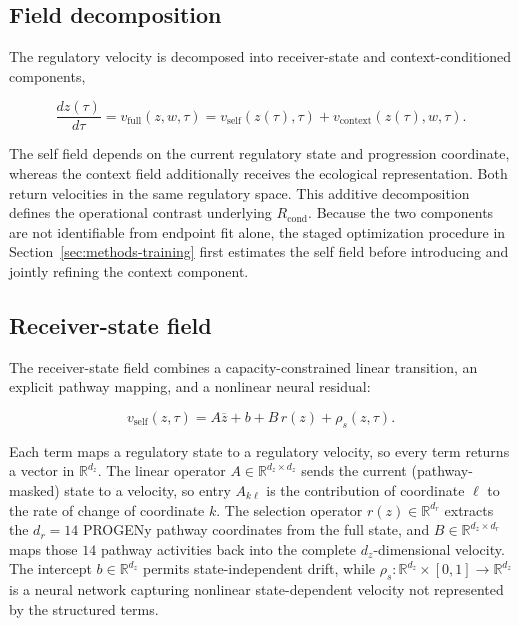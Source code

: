 \subsection{Field decomposition}
\label{sec:methods-field-decomposition}

The regulatory velocity is decomposed into receiver-state and
context-conditioned components,

\begin{equation}
\frac{dz(\tau)}{d\tau}
=
v_{\mathrm{full}}(z,w,\tau)
=
v_{\mathrm{self}}\!\left(z(\tau),\tau\right)
+
v_{\mathrm{context}}\!\left(z(\tau),w,\tau\right).
\label{eq:methods-stagebridge-field}
\end{equation}

The self field depends on the current regulatory state and progression
coordinate, whereas the context field additionally receives the ecological
representation. Both return velocities in the same regulatory space. This
additive decomposition defines the operational contrast underlying
\(R_{\mathrm{cond}}\). Because the two components are not identifiable from
endpoint fit alone, the staged optimization procedure in
Section~\ref{sec:methods-training} first estimates the self field before
introducing and jointly refining the context component.

\subsection{Receiver-state field}
\label{sec:methods-self-field}

The receiver-state field combines a capacity-constrained linear transition, an
explicit pathway mapping, and a nonlinear neural residual:

\begin{equation}
v_{\mathrm{self}}(z,\tau)
=
A\overline{z}
+
b
+
B\,r(z)
+
\rho_s(z,\tau).
\label{eq:methods-self-field}
\end{equation}

Each term maps a regulatory state to a regulatory velocity, so every term
returns a vector in \(\mathbb{R}^{d_z}\). The linear operator
\(A\in\mathbb{R}^{d_z\times d_z}\) sends the current (pathway-masked) state to a
velocity, so entry \(A_{k\ell}\) is the contribution of coordinate \(\ell\) to
the rate of change of coordinate \(k\). The selection operator
\(r(z)\in\mathbb{R}^{d_r}\) extracts the \(d_r=14\) PROGENy pathway coordinates
from the full state, and \(B\in\mathbb{R}^{d_z\times d_r}\) maps those \(14\)
pathway activities back into the complete \(d_z\)-dimensional velocity. The
intercept \(b\in\mathbb{R}^{d_z}\) permits state-independent drift, while
\(\rho_s:\mathbb{R}^{d_z}\times[0,1]\rightarrow\mathbb{R}^{d_z}\)
is a neural network capturing nonlinear state-dependent velocity not
represented by the structured terms.

